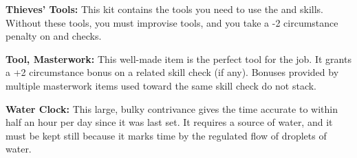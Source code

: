 \textbf{Thieves' Tools:} This kit contains the tools you need to use the  and  skills. Without these tools, you must improvise tools, and you take a -2 circumstance penalty on  and  checks.

\textbf{Tool, Masterwork:} This well-made item is the perfect tool for the job. It grants a +2 circumstance bonus on a related skill check (if any). Bonuses provided by multiple masterwork items used toward the same skill check do not stack.

\textbf{Water Clock:} This large, bulky contrivance gives the time accurate to within half an hour per day since it was last set. It requires a source of water, and it must be kept still because it marks time by the regulated flow of droplets of water.